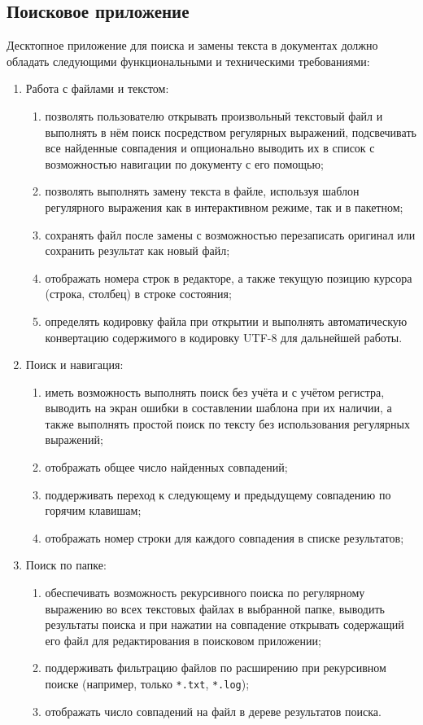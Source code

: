 \subsection{Поисковое приложение}

Десктопное приложение для поиска и замены текста в документах должно обладать
следующими функциональными и техническими требованиями:

\begin{enumerate}
	\item Работа с файлами и текстом:
	\begin{enumerate}[label=\alph*)]
		\item позволять пользователю открывать произвольный текстовый файл
		и выполнять в нём поиск посредством регулярных выражений, подсвечивать
		все найденные совпадения и опционально выводить их в список с возможностью
		навигации по документу с его помощью;
		\item позволять выполнять замену текста в файле, используя шаблон
		регулярного выражения как в интерактивном режиме, так и в пакетном;
		\item сохранять файл после замены с возможностью перезаписать оригинал
		или сохранить результат как новый файл;
		\item отображать номера строк в редакторе, а также текущую позицию
		курсора (строка, столбец) в строке состояния;
		\item определять кодировку файла при открытии и выполнять автоматическую
		конвертацию содержимого в кодировку UTF-8 для дальнейшей работы.
	\end{enumerate}
	
	\item Поиск и навигация:
	\begin{enumerate}[label=\alph*)]
		\item иметь возможность выполнять поиск без учёта и с учётом регистра,
		выводить на экран ошибки в составлении шаблона при их наличии, а также
		выполнять простой поиск по тексту без использования регулярных выражений;
		\item отображать общее число найденных совпадений;
		\item поддерживать переход к следующему и предыдущему совпадению
		по горячим клавишам;
		\item отображать номер строки для каждого совпадения
		в списке результатов;
	\end{enumerate}
	
	\item Поиск по папке:
	\begin{enumerate}[label=\alph*)]
		\item обеспечивать возможность рекурсивного поиска по регулярному
		выражению во всех текстовых файлах в выбранной папке, выводить результаты
		поиска и при нажатии на совпадение открывать содержащий его файл
		для редактирования в поисковом приложении;
		\item поддерживать фильтрацию файлов по расширению при рекурсивном
		поиске (например, только \verb|*.txt|, \verb|*.log|);
		\item отображать число совпадений на файл в дереве результатов поиска.
	\end{enumerate}
	

\end{enumerate}

